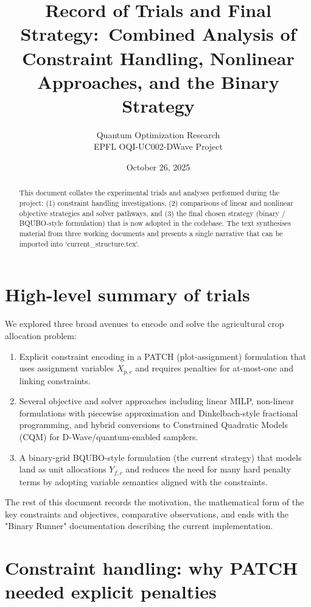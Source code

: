 \documentclass[11pt,a4paper]{article}
\title{Record of Trials and Final Strategy:\ Combined Analysis of Constraint Handling, Nonlinear Approaches, and the Binary Strategy}
\author{Quantum Optimization Research\\EPFL OQI-UC002-DWave Project}
\date{October 26, 2025}
\begin{document}
\maketitle

\begin{abstract}
This document collates the experimental trials and analyses performed during the project: (1) constraint handling investigations, (2) comparisons of linear and nonlinear objective strategies and solver pathways, and (3) the final chosen strategy (binary / BQUBO-style formulation) that is now adopted in the codebase. The text synthesises material from three working documents and presents a single narrative that can be imported into `current_structure.tex`.
\end{abstract}

\section{High-level summary of trials}

We explored three broad avenues to encode and solve the agricultural crop allocation problem:

\begin{enumerate}
    \item Explicit constraint encoding in a PATCH (plot-assignment) formulation that uses assignment variables $X_{p,c}$ and requires penalties for at-most-one and linking constraints.
    \item Several objective and solver approaches including linear MILP, non-linear formulations with piecewise approximation and Dinkelbach-style fractional programming, and hybrid conversions to Constrained Quadratic Models (CQM) for D-Wave/quantum-enabled samplers.
    \item A binary-grid BQUBO-style formulation (the current strategy) that models land as unit allocations $Y_{f,c}$ and reduces the need for many hard penalty terms by adopting variable semantics aligned with the constraints.
\end{enumerate}

The rest of this document records the motivation, the mathematical form of the key constraints and objectives, comparative observations, and ends with the "Binary Runner" documentation describing the current implementation.

\section{Constraint handling: why PATCH needed explicit penalties}
\end{document}
